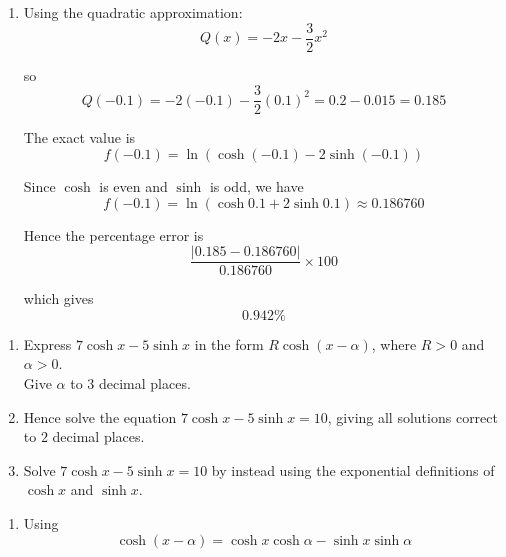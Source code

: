 \documentclass[leqno]{article}
\begin{document}
\begin{enumerate}[
  label=\textbf{\arabic*.},
  leftmargin=*,
  topsep=0pt,
  partopsep=0pt,
  parsep=0pt
]
\begin{djsSolution}
\begin{enumerate}[label=\textbf{(\alph*)}]
First:
\[
f(0)=\ln(\cosh 0-2\sinh 0)=\ln(1-0)=\ln 1=0
\]

Next, from part (b)(i):
\[
f'(0)=\frac{\sinh 0-2\cosh 0}{\cosh 0-2\sinh 0}
=\frac{0-2}{1-0}=-2
\]

From part (b)(ii):
\[
f''(0)=\frac{-3}{(\cosh 0-2\sinh 0)^2}
=\frac{-3}{1^2}=-3
\]

Substituting into the Maclaurin formula:
\[
f(x)\approx 0+x(-2)+\frac{x^2}{2!}(-3)
\]

So the quadratic approximation is
\[
f(x)\approx -2x-\frac{3}{2}x^2
\]

  \item Using the quadratic approximation:
\[
Q(x)=-2x-\frac{3}{2}x^2
\]

so
\[
Q(-0.1)=-2(-0.1)-\frac{3}{2}(0.1)^2=0.2-0.015=0.185
\]

The exact value is
\[
f(-0.1)=\ln(\cosh(-0.1)-2\sinh(-0.1))
\]

Since $\cosh$ is even and $\sinh$ is odd, we have
\[
f(-0.1)=\ln(\cosh 0.1+2\sinh 0.1)\approx 0.186760
\]

Hence the percentage error is
\[
\frac{|0.185-0.186760|}{0.186760}\times 100
\]

which gives
\[
0.942\%
\]
\end{enumerate}
\end{djsSolution}


\newpage

\questionitem

\begin{enumerate}[label=\textbf{(\alph*)}]
  \item Express $7\cosh x - 5\sinh x$ in the form $R\cosh(x - \alpha)$, where $R > 0$ and $\alpha > 0$.\\ Give $\alpha$ to $3$ decimal places.  \\
  \item Hence solve the equation $7\cosh x - 5\sinh x = 10$, giving all solutions correct to $2$ decimal places.  \\
  \item Solve $7\cosh x - 5\sinh x = 10$ by instead using the exponential definitions of $\cosh x$ and $\sinh x$.  \\
\end{enumerate}

\vspace*{10pt}

\begin{djsSolution}
\begin{enumerate}[label=\textbf{(\alph*)}]
  \item Using
  \[
  \cosh(x-\alpha)=\cosh x\cosh\alpha-\sinh x\sinh\alpha
  \]


\end{enumerate}
\end{djsSolution}
\end{enumerate}
\end{document}
